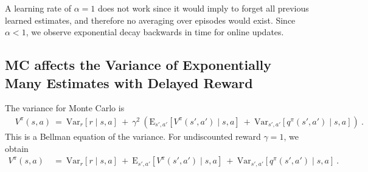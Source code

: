 \documentclass{article}
\newcommand\EXP{\mathbf{\mathrm{E}}}
\newcommand\VAR{\mathbf{\mathrm{Var}}}
\begin{document}
\begin{appendices}
A learning rate of $\alpha=1$ does not work since it would imply to
forget all previous learned estimates, and therefore no averaging over
episodes would exist.
Since $\alpha<1$, we observe exponential decay backwards in time for online updates. 


\subsection{MC affects the Variance of Exponentially Many Estimates
  with Delayed Reward }
  \label{sec:AMCvariance}


The variance for Monte Carlo is
\begin{align}
  &V^{\pi}(s,a) \ = \ \VAR_r \left[ r \mid s,a \right] \ + \ \gamma^2  \  \left(
    \EXP_{s',a'}  \left[V^{\pi}(s',a') \mid s,a\right]
  \ + \   \VAR_{s',a'} \left[q^\pi(s', a') \mid s,a\right]  \right)
  \ .  
\end{align}
This is a Bellman equation of the variance. For undiscounted reward $\gamma=1$, we obtain
\begin{align}
  V^{\pi}(s,a) \ &= \ \VAR_r \left[ r \mid s,a \right] \ + \ 
    \EXP_{s',a'}  \left[V^{\pi}(s',a') \mid s,a\right]
  \ + \   \VAR_{s',a'} \left[q^\pi(s', a') \mid s,a\right]    \ .  
\end{align}


\end{appendices}
\end{document}
